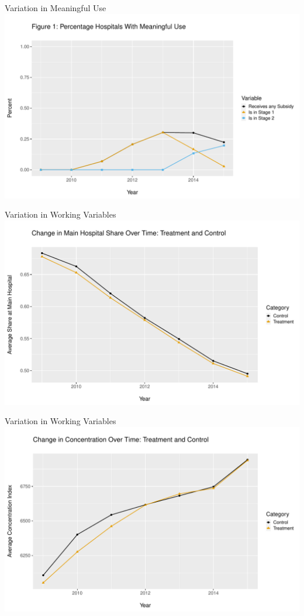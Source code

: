 \documentclass[10pt]{beamer}
\begin{document}
\begin{frame}{Variation in Meaningful Use}
    \centering
    \includegraphics[scale=.5]{Objects/TYP_plot_hospmeanuse_year.pdf}
\end{frame}


\begin{frame}{Variation in Working Variables}
    \centering
    \includegraphics[scale=.5]{Objects/mainhosp_share_treatvscontrol.pdf}
\end{frame}


\begin{frame}{Variation in Working Variables}
\centering
\includegraphics[scale=.5]{Objects/hhi_treatvscontrol.pdf}
\end{frame}
\end{document}

